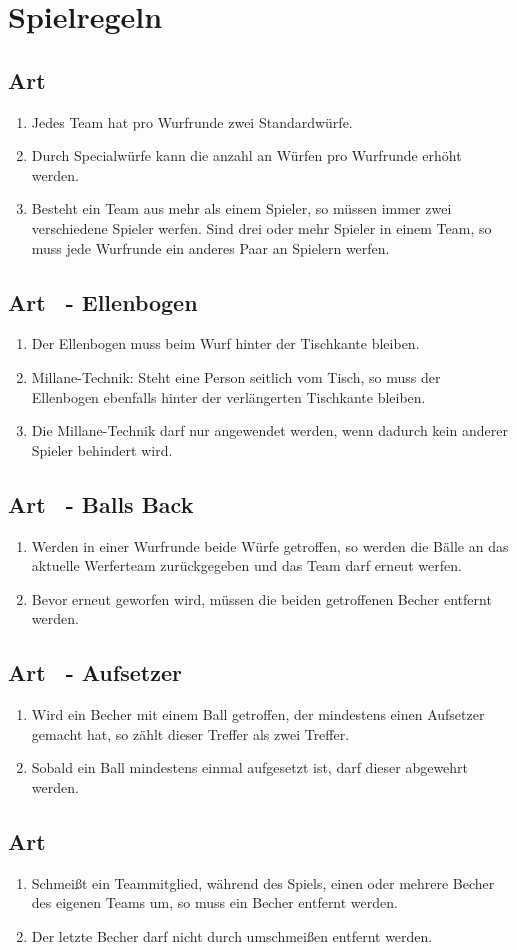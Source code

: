 \documentclass[a4paper,11pt]{scrartcl}
\newcommand{\enum}[1]{\begin{enumerate}[label=(\arabic*)]#1\end{enumerate}}
\newcommand{\art}[2]{\subsection*{#1} \enum{#2}}
\newcommand{\quot}[1]{\glqq #1\grqq}
\newcounter{art}
\begin{document}
\section{Spielregeln}

\art{Art \theart}{
    \item
        Jedes Team hat pro Wurfrunde zwei Standardwürfe.
    \item
        Durch Specialwürfe kann die anzahl an Würfen pro Wurfrunde erhöht werden.
    \item
        Besteht ein Team aus mehr als einem Spieler, so müssen immer zwei verschiedene Spieler werfen. Sind drei oder mehr Spieler in einem Team, so muss jede Wurfrunde ein anderes Paar an Spielern werfen.
}

\art{Art \theart\ - Ellenbogen}{
    \item
        Der Ellenbogen muss beim Wurf hinter der Tischkante bleiben.
    \item
        Millane-Technik: Steht eine Person seitlich vom Tisch, so muss der Ellenbogen ebenfalls hinter der verlängerten Tischkante bleiben.
    \item
        Die Millane-Technik darf nur angewendet werden, wenn dadurch kein anderer Spieler behindert wird.
}

\art{Art \theart\ - \quot{Balls Back}}{
    \item
        Werden in einer Wurfrunde beide Würfe getroffen, so werden die Bälle an das aktuelle Werferteam zurückgegeben und das Team darf erneut werfen.
    \item
        Bevor erneut geworfen wird, müssen die beiden getroffenen Becher entfernt werden.
}

\art{Art \theart\ - Aufsetzer}{
    \item
        Wird ein Becher mit einem Ball getroffen, der mindestens einen Aufsetzer gemacht hat, so zählt dieser Treffer als zwei Treffer.
    \item
        Sobald ein Ball mindestens einmal aufgesetzt ist, darf dieser abgewehrt werden.
}

\art{Art \theart}{
    \item
        Schmeißt ein Teammitglied, während des Spiels, einen oder mehrere Becher des eigenen Teams um, so muss ein Becher entfernt werden.
    \item
        Der letzte Becher darf nicht durch umschmeißen entfernt werden.
}
\end{document}
